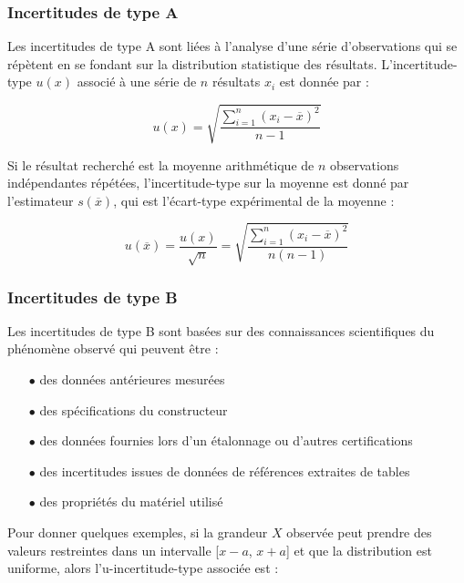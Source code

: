 \documentclass{article}
\begin{document}
\subsubsection{Incertitudes de type A}

Les incertitudes de type A sont liées à l'analyse d'une série d'observations qui se répètent en se fondant sur la distribution statistique des résultats. L'incertitude-type $u(x)$ associé à une série de $n$ résultats $x_i$ est donnée par :

\begin{equation}
  u(x) = \sqrt{\dfrac{\sum\limits_{i=1}^n (x_i - \overline{x})^2}{n-1}}
\end{equation}

Si le résultat recherché est la moyenne arithmétique de $n$ observations indépendantes répétées, l'incertitude-type sur la moyenne est donné par l'estimateur $s(\overline{x})$, qui est l'écart-type expérimental de la moyenne :

\begin{equation}
  u(\overline{x}) = \dfrac{u(x)}{\sqrt{n}} = \sqrt{\dfrac{\sum\limits_{i=1}^n (x_i - \overline{x})^2}{n(n-1)}}
\end{equation}

\subsubsection{Incertitudes de type B}

Les incertitudes de type B sont basées sur des connaissances scientifiques du phénomène observé qui peuvent être :

\begin{itemize}
  \item[$\bullet$] des données antérieures mesurées
  \item[$\bullet$] des spécifications du constructeur
  \item[$\bullet$] des données fournies lors d'un étalonnage ou d'autres certifications
  \item[$\bullet$] des incertitudes issues de données de références extraites de tables
  \item[$\bullet$] des propriétés du matériel utilisé
\end{itemize}

Pour donner quelques exemples, si la grandeur $X$ observée peut prendre des valeurs restreintes dans un intervalle [$x - a$, $x + a$] et que la distribution est uniforme, alors l'u-incertitude-type associée est :
\end{document}
